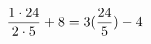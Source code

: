 \documentclass[preview]{standalone}
\begin{document}
\begin{align*}
\special{dvisvgm:raw <g id='unique000'>}\frac{1 \cdot 24}{2 \cdot 5} + 8 = 3(\frac{24}{5}) - 4\special{dvisvgm:raw </g>}
\end{align*}
\end{document}
